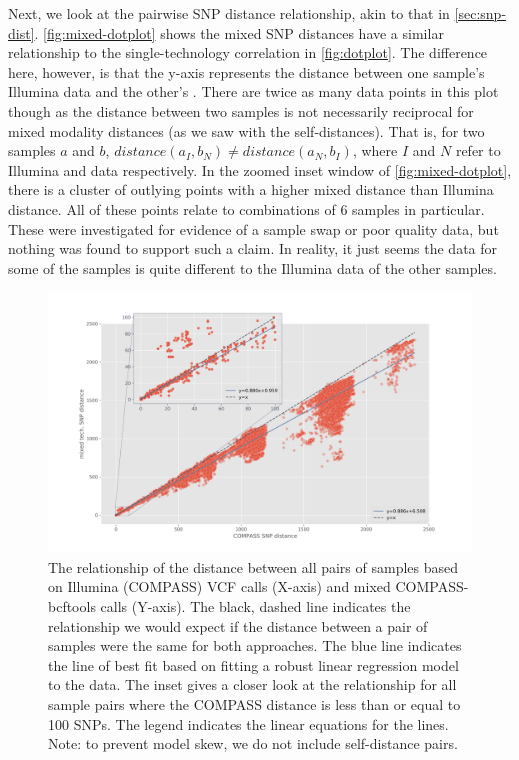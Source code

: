 Next, we look at the pairwise SNP distance relationship, akin to that in \autoref{sec:snp-dist}. \autoref{fig:mixed-dotplot} shows the mixed SNP distances have a similar relationship to
the single-technology correlation in \autoref{fig:dotplot}. The difference here, however, is that
the y-axis represents the distance between one sample's Illumina data
and the other's \ont{}. There are twice as many data points in this plot though as the distance between two samples is not necessarily reciprocal for mixed modality distances (as we saw with the self-distances). That is, for two samples $a$ and $b$, $distance(a_I,b_N) \neq distance(a_N, b_I)$, where $I$ and $N$ refer to Illumina and \ont{} data respectively. In the zoomed inset window of \autoref{fig:mixed-dotplot}, there is a cluster of outlying points with a higher mixed distance than Illumina distance. All of these points relate to combinations of 6 samples in particular. These were investigated for evidence of a sample swap or poor quality data, but nothing was found to support such a claim. In reality, it just seems the \ont{} data for some of the samples is quite different to the Illumina data of the other samples.

\begin{figure}
\begin{center}
\includegraphics[width=0.90\columnwidth]{Chapter2/Figs/mixed-dotplot.png}
\caption{{The relationship of the distance between all pairs of samples based on
Illumina (COMPASS) VCF calls (X-axis) and mixed COMPASS-bcftools calls (Y-axis).
The black, dashed line indicates the relationship we would expect if the
distance between a pair of samples were the same for both approaches.
The blue line indicates the line of best fit based on fitting a robust
linear regression model to the data. The inset gives a closer look at
the relationship for all sample pairs where the COMPASS distance is less
than or equal to 100 SNPs. The legend indicates the linear equations for
the lines. Note: to prevent model skew, we do not include self-distance
pairs.
{\label{fig:mixed-dotplot}}%
}}
\end{center}
\end{figure}



